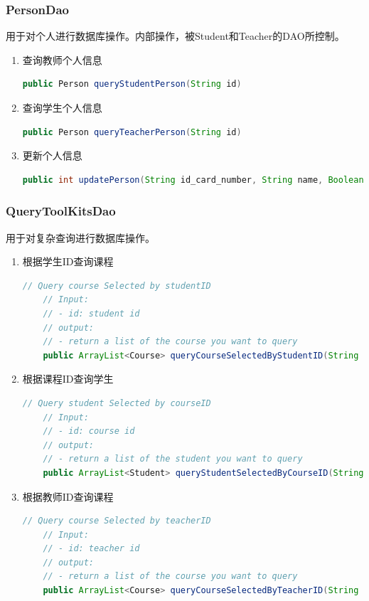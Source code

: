 \documentclass[../report.tex]{subfiles}
\begin{document}
\subsubsection{PersonDao}
用于对个人进行数据库操作。内部操作，被Student和Teacher的DAO所控制。
\begin{enumerate}
\itemsep 0em
\item 查询教师个人信息\\
\begin{lstlisting}[language=java,backgroundcolor=\color{lightgray}]
	public Person queryStudentPerson(String id)
\end{lstlisting}
\item 查询学生个人信息\\
\begin{lstlisting}[language=java,backgroundcolor=\color{lightgray}]
	public Person queryTeacherPerson(String id) 
\end{lstlisting}
\item 更新个人信息\\
\begin{lstlisting}[language=java,backgroundcolor=\color{lightgray}]
	public int updatePerson(String id_card_number, String name, Boolean gender, String birth, String nationality, String address, String address_postal_code, String address_phone_number) 
\end{lstlisting}
\end{enumerate}
\subsubsection{QueryToolKitsDao}
用于对复杂查询进行数据库操作。
\begin{enumerate}
\itemsep 0em
\item 根据学生ID查询课程\\
\begin{lstlisting}[language=java,backgroundcolor=\color{lightgray}]
    // Query course Selected by studentID
    // Input:
    // - id: student id
    // output:
    // - return a list of the course you want to query
    public ArrayList<Course> queryCourseSelectedByStudentID(String studentID)
\end{lstlisting}
\item 根据课程ID查询学生\\
\begin{lstlisting}[language=java,backgroundcolor=\color{lightgray}]
    // Query student Selected by courseID
    // Input:
    // - id: course id
    // output:
    // - return a list of the student you want to query
    public ArrayList<Student> queryStudentSelectedByCourseID(String courseID)
\end{lstlisting}
\item 根据教师ID查询课程\\
\begin{lstlisting}[language=java,backgroundcolor=\color{lightgray}]
    // Query course Selected by teacherID
    // Input:
    // - id: teacher id
    // output:
    // - return a list of the course you want to query
    public ArrayList<Course> queryCourseSelectedByTeacherID(String teacherID)
\end{lstlisting}
\end{enumerate}
\end{document}
